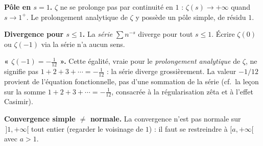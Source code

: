 \vspace{6pt}

\begin{mdframed}[style=cexbar]
  \textbf{Pôle en $s=1$.}\enspace%
  $\zeta$ ne se prolonge pas par continuité en $1$ : $\zeta(s)\to+\infty$ quand
  $s\to 1^{+}$. Le prolongement analytique de $\zeta$ y possède un pôle simple,
  de résidu $1$.

  \smallskip\noindent
  \textbf{Divergence pour $s\leq 1$.}\enspace%
  La \emph{série} $\sum n^{-s}$ diverge pour tout $s\leq 1$. Écrire
  $\zeta(0)$ ou $\zeta(-1)$ via la série n'a aucun sens.

  \smallskip\noindent
  \textbf{« $\zeta(-1)=-\tfrac{1}{12}$ ».}\enspace%
  Cette égalité, vraie pour le \emph{prolongement analytique} de $\zeta$, ne signifie pas $1+2+3+\cdots=-\tfrac{1}{12}$ : la
  série diverge grossièrement. La valeur $-1/12$ provient de l'équation
  fonctionnelle, pas d'une sommation de la série (cf.\ la leçon sur la somme
  $1+2+3+\cdots=-\tfrac{1}{12}$, consacrée à la régularisation zêta et à
  l'effet Casimir).

  \smallskip\noindent
  \textbf{Convergence simple $\neq$ normale.}\enspace%
  La convergence n'est pas normale sur $\,]1,+\infty[$ tout entier (regarder le
  voisinage de $1$) : il faut se restreindre à $[a,+\infty[$ avec $a>1$.
\end{mdframed}

\vspace{6pt}
\exolabel

